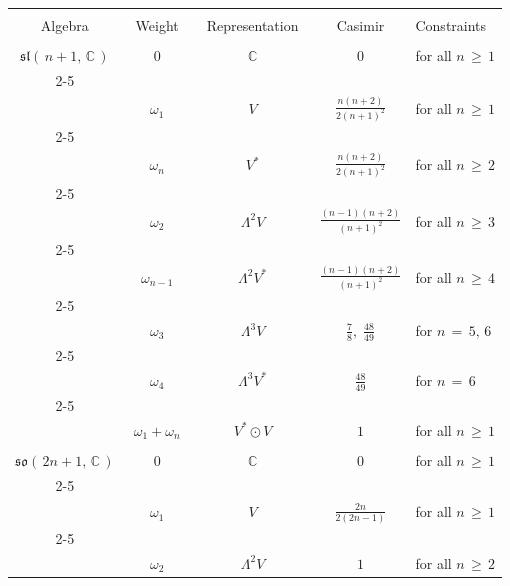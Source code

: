 \documentclass[12pt]{article}
\def\C{\mathbb{C}}
\def\L{\Lambda}
\def\sl{\mathfrak{sl}}
\def\so{\mathfrak{so}}
\begin{document}
 \begin{center}
  \begin{tabular}{| c | c | c | c | l |}
   \hline&&&&
   \\[-10pt]
   \ \small{Algebra}\ & \ \small{Weight}\  & \ \small{Representation}\  &
   \ \small{Casimir}\ & \quad\small{Constraints}
   \\[3pt]
   \hline\hline&&&&
   \\[-10pt]
   $\sl(\,n+1,\,\C\,)$ & $0$ & $\C$ & $0$ &
   \quad for all $n\,\geq\,1$
   \\[3pt]
   \cline{2-5}&&&&
   \\[-10pt]
   & $\omega_1$ & $V$ & $\frac{n(n+2)}{2(n+1)^2}$ &
   \quad for all $n\,\geq\,1$
   \\[3pt]
   \cline{2-5}&&&&
   \\[-10pt]
   & $\omega_n$ & $V^*$ & $\frac{n(n+2)}{2(n+1)^2}$ &
   \quad for all $n\,\geq\,2$
   \\[3pt]
   \cline{2-5}&&&&
   \\[-10pt]
   & $\omega_2$ & $\L^2V$ & $\frac{(n-1)(n+2)}{(n+1)^2}$ &
   \quad for all $n\,\geq\,3$
   \\[3pt]
   \cline{2-5}&&&&
   \\[-10pt]
   & $\omega_{n-1}$ & $\L^2V^*$ & $\frac{(n-1)(n+2)}{(n+1)^2}$ &
   \quad for all $n\,\geq\,4$
   \\[3pt]
   \cline{2-5}&&&&
   \\[-10pt]
   & $\omega_3$ & $\L^3V$ & $\frac78,\;\frac{48}{49}$ &
   \quad for $n\,=\,5,\,6$
   \\[3pt]
   \cline{2-5}&&&&
   \\[-10pt]
   & $\omega_4$ & $\L^3V^*$ & $\frac{48}{49}$ &
   \quad for $n\,=\,6$
   \\[3pt]
   \cline{2-5}&&&&
   \\[-10pt]
   & $\omega_1+\omega_n$ & $V^*\odot V$ & $1$ &
   \quad for all $n\,\geq\,1$
   \\[3pt]
   \hline\hline&&&&
   \\[-10pt]
   $\so(\,2n+1,\,\C\,)$ & $0$ & $\C$ & $0$ &
   \quad for all $n\,\geq\,1$
   \\[3pt]
   \cline{2-5}&&&&
   \\[-10pt]
   & $\omega_1$ & $V$ & $\frac{2n}{2(2n-1)}$ &
   \quad for all $n\,\geq\,1$
   \\[3pt]
   \cline{2-5}&&&&
   \\[-10pt]
   & $\omega_2$ & $\L^2V$ & $1$ &
   \quad for all $n\,\geq\,2$
   \\[3pt]

\end{tabular}
\end{center}
\end{document}
